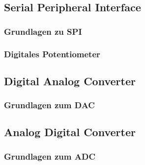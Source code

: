 \documentclass[paper=a4, 12pt]{scrreprt}
\begin{document}
		\subsection{Serial Peripheral Interface}
			\subsubsection{Grundlagen zu SPI}
			\subsubsection{Digitales Potentiometer}
			\newpage
		\subsection{Digital Analog Converter}
			\subsubsection{Grundlagen zum DAC}
			\newpage
		\subsection{Analog Digital Converter}
			\subsubsection{Grundlagen zum ADC}
			\newpage



\appendix



\setcounter{lofdepth}{2}
\dipalistoffigures

\newpage
{}\lstlistoflistings


\end{document}
